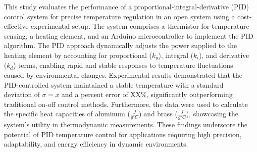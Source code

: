 This study evaluates the performance of a proportional-integral-derivative
(PID) control system for precise temperature regulation in an open system
using a cost-effective experimental setup.
The system comprises a thermistor for temperature sensing, a heating element,
and an Arduino microcontroller to implement the PID algorithm.
The PID approach dynamically adjusts the power supplied to the heating element
by accounting for proportional (\(k_p\)), integral (\(k_i\)), and derivative
(\(k_d\)) terms, enabling rapid and stable responses to temperature
fluctuations caused by environmental changes.
Experimental results demonstrated that the PID-controlled system maintained a
stable temperature with a standard deviation of \( \sigma = x \) and a percent
error of XX\%, significantly outperforming traditional on-off control methods.
Furthermore, the data were used to calculate the specific heat capacities of
aluminum (\(\frac{J}{g^{\circ}C}\)) and brass (\(\frac{J}{g^{\circ}C}\)),
showcasing the system's utility in thermodynamic measurements.
These findings underscore the potential of PID temperature control for
applications requiring high precision, adaptability, and energy efficiency in
dynamic environments.